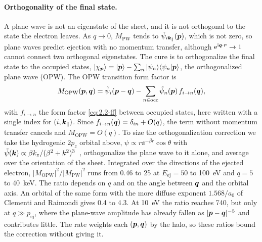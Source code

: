 \paragraph{Orthogonality of the final state.} A plane wave is not an eigenstate of the sheet, and it is not orthogonal to the state the electron leaves. As $q \to 0$, $M_{\mathrm{PW}}$ tends to $\tilde\psi_{i\bm{k}_\parallel}(\bm{p})$, which is not zero, so plane waves predict ejection with no momentum transfer, although $\mathrm{e}^{\mathrm{i}\bm{q}\cdot\bm{r}} \to 1$ cannot connect two orthogonal eigenstates. The cure is to orthogonalize the final state to the occupied states, $|\chi_{\bm{p}}\rangle = |\bm{p}\rangle - \sum_n|\psi_n\rangle\langle\psi_n|\bm{p}\rangle$, the orthogonalized plane wave (OPW). The OPW transition form factor is
\begin{equation}
  M_{\mathrm{OPW}}(\bm{p},\bm{q}) = \tilde\psi_i(\bm{p} - \bm{q}) - \sum_{n\in\mathrm{occ}}\tilde\psi_n(\bm{p})\,f_{i\to n}(\bm{q}) ,
  \label{eq:16.3-opw}
\end{equation}
with $f_{i\to n}$ the form factor \cref{eq:2.2-ff} between occupied states, here written with a single index for $(i,\bm{k}_\parallel)$. Since $f_{i\to n}(\bm{q}) = \delta_{in} + O(q)$, the term without momentum transfer cancels and $M_{\mathrm{OPW}} = O(q)$. To size the orthogonalization correction we take the hydrogenic $2p_z$ orbital above, $\psi \propto r\ee^{-\beta r}\cos\theta$ with $\tilde\psi(\bm{k}) \propto \beta k_z/(\beta^2 + k^2)^3$~\cite[Eq.~(4)]{hochberg2017directional}, orthogonalize the plane wave to it alone, and average over the orientation of the sheet. Integrated over the directions of the ejected electron, $|M_{\mathrm{OPW}}|^2/|M_{\mathrm{PW}}|^2$ runs from 0.46 to 25 at $E_{\mathrm{ej}} = 50$ to \SI{100}{eV} and $q = 5$ to \SI{40}{keV}. The ratio depends on $q$ and on the angle between $\bm{q}$ and the orbital axis. An orbital of the same form with the more diffuse exponent $1.568/a_0$ of Clementi and Raimondi gives 0.4 to 4.3. At \SI{10}{eV} the ratio reaches 740, but only at $q \gg p_{\mathrm{ej}}$, where the plane-wave amplitude has already fallen as $|\bm{p} - \bm{q}|^{-5}$ and contributes little. The rate weights each $(\bm{p},\bm{q})$ by the halo, so these ratios bound the correction without giving it.

